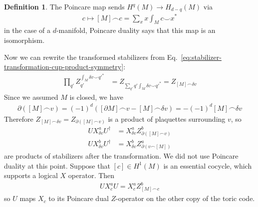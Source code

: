 \documentclass{article}
\theoremstyle{definition}
\newtheorem{defn}{Definition}
\theoremstyle{definition}
\begin{document}
\begin{defn}\label{def:Poincare-duality-isomorphism}
  The Poincare map sends $H^{q}(M) \to H_{d-q}(M)$ via
  \begin{align}
    c \mapsto [M] \frown c = \sum_{x}x \int_M c \smile x^*
  \end{align}
  in the case of a $d$-manifold, Poincare duality says that this map is an isomorphism.
\end{defn}
Now we can rewrite the transformed stabilizers from Eq.~\eqref{eq:stabilizer-transformation-cup-product-symmetry}:
\begin{align}
  \prod_{q'}Z_{q'}^{\int_M \delta v \smile q'^*} &= Z_{\sum_{q'} q'\int_M \delta v \smile q'^*} = Z_{[M] \frown \delta v}
\end{align}
Since we assumed $M$ is closed, we have
\begin{align}
\partial([M] \frown  v) = (-1)^d([\partial M] \frown v - [M] \frown \delta v) = -(-1)^d [M] \frown \delta v
\end{align}
Therefore  $Z_{[M] \frown \delta v} = Z_{\partial([M] \frown  v)}$ is a product
of plaquettes surrounding $v$, so 
\begin{align}
  UX_{\delta v}^aU^\dagger &= X_{\delta v}^aZ^b_{\partial([M] \frown v)} \\
  UX_{\delta v}^bU^\dagger &= X_{\delta v}^bZ^a_{\partial(v \frown [M])}
\end{align}
are products of stabilizers after the transformation. We did not use Poincare
duality at this point. Suppose that $[c] \in H^1(M)$ is an essential cocycle,
which supports a logical $X$ operator. Then 
\begin{align}
  UX^a_cU = X^a_c Z^b_{[M] \frown c}
\end{align}
so $U$ maps $X_c$  to its Poincare dual $Z$-operator on the other copy of the
toric code.
\end{document}
